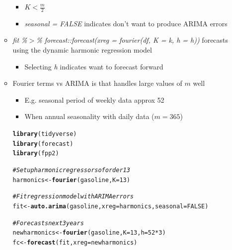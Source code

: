 \documentclass{article}\usepackage[]{graphicx}\usepackage[]{color}
\makeatletter
\newcommand{\hlnum}[1]{\textcolor[rgb]{0.686,0.059,0.569}{#1}}%
\newcommand{\hlcom}[1]{\textcolor[rgb]{0.678,0.584,0.686}{\textit{#1}}}%
\newcommand{\hlopt}[1]{\textcolor[rgb]{0,0,0}{#1}}%
\newcommand{\hlstd}[1]{\textcolor[rgb]{0.345,0.345,0.345}{#1}}%
\newcommand{\hlkwb}[1]{\textcolor[rgb]{0.69,0.353,0.396}{#1}}%
\newcommand{\hlkwc}[1]{\textcolor[rgb]{0.333,0.667,0.333}{#1}}%
\newcommand{\hlkwd}[1]{\textcolor[rgb]{0.737,0.353,0.396}{\textbf{#1}}}%
\newenvironment{kframe}{%
 \def\at@end@of@kframe{}%
 \ifinner\ifhmode%
  \def\at@end@of@kframe{\end{minipage}}%
  \begin{minipage}{\columnwidth}%
 \fi\fi%
 \def\FrameCommand##1{\hskip\@totalleftmargin \hskip-\fboxsep
 \colorbox{shadecolor}{##1}\hskip-\fboxsep
     \hskip-\linewidth \hskip-\@totalleftmargin \hskip\columnwidth}%
 \MakeFramed {\advance\hsize-\width
   \@totalleftmargin\z@ \linewidth\hsize
   \@setminipage}}%
 {\par\unskip\endMakeFramed%
 \at@end@of@kframe}
\newenvironment{knitrout}{}{} %
\makeatother
\begin{document}
\begin{itemize}
\begin{itemize}
\begin{itemize}
            \item $K < \frac{m}{2}$
            \item \textit{seasonal = FALSE} indicates don't want to produce ARIMA errors
        \end{itemize}
        \item \textit{fit \%$>$\% forecast::forecast(xreg = fourier(df, K = k, h = h))} forecasts using the dynamic harmonic regression model
        \begin{itemize}
            \item Selecting \textit{h} indicates want to forecast forward
        \end{itemize}
        \item Fourier terms vs ARIMA is that handles large values of $m$ well 
        \begin{itemize}
            \item E.g. seasonal period of weekly data approx 52
            \item When annual seasonality with daily data ($m=365$)
        \end{itemize}
\begin{knitrout}
\color{fgcolor}\begin{kframe}
\begin{alltt}
\hlkwd{library}\hlstd{(tidyverse)}
\hlkwd{library}\hlstd{(forecast)}
\hlkwd{library}\hlstd{(fpp2)}

\hlcom{# Set up harmonic regressors of order 13}
\hlstd{harmonics} \hlkwb{<-} \hlkwd{fourier}\hlstd{(gasoline,} \hlkwc{K} \hlstd{=} \hlnum{13}\hlstd{)}

\hlcom{# Fit regression model with ARIMA errors}
\hlstd{fit} \hlkwb{<-} \hlkwd{auto.arima}\hlstd{(gasoline,} \hlkwc{xreg} \hlstd{= harmonics,} \hlkwc{seasonal} \hlstd{=} \hlnum{FALSE}\hlstd{)}

\hlcom{# Forecasts next 3 years}
\hlstd{newharmonics} \hlkwb{<-} \hlkwd{fourier}\hlstd{(gasoline,} \hlkwc{K} \hlstd{=} \hlnum{13}\hlstd{,} \hlkwc{h} \hlstd{=} \hlnum{52}\hlopt{*}\hlnum{3}\hlstd{)}
\hlstd{fc} \hlkwb{<-} \hlkwd{forecast}\hlstd{(fit,} \hlkwc{xreg} \hlstd{= newharmonics)}


\end{alltt}
\end{kframe}
\end{knitrout}
\end{itemize}
\end{itemize}
\end{document}
